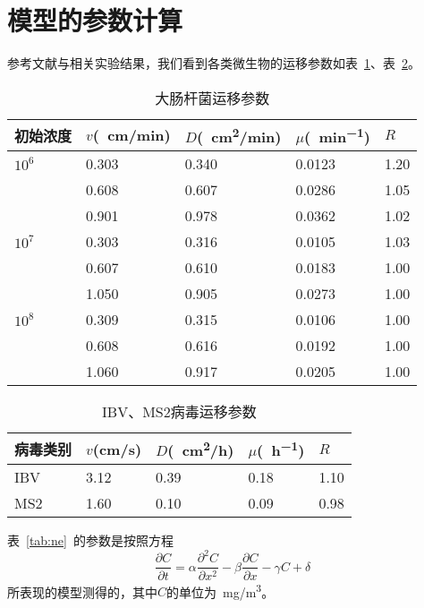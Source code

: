 \section{模型的参数计算}
参考文献与相关实验结果，我们看到各类微生物的运移参数如表~\ref{tab:dachangganjun}、表~\ref{tab:ibv}。
\begin{table}[!ht]
\caption{\label{tab:dachangganjun}大肠杆菌运移参数}
\centering
\begin{tabularx}{14cm}{XXXXX}
\toprule
初始浓度 & $v$(\SI{}{cm/min}) & $D$(\SI{}{cm^2/min}) & $\mu$(\SI{}{min^{-1}}) & $R$\\
\midrule
$10^6$	&	0.303	&	0.340	&	0.0123	&	1.20 \\
		&	0.608	&	0.607	&	0.0286	&	1.05 \\
		&	0.901	&	0.978	&	0.0362	&	1.02 \\
$10^7$	&	0.303	&	0.316	&	0.0105	&	1.03 \\
		&	0.607	&	0.610	&	0.0183	&	1.00 \\
		&	1.050	&	0.905	&	0.0273	&	1.00 \\
$10^8$	&	0.309	&	0.315	&	0.0106	&	1.00 \\
		&	0.608	&	0.616	&	0.0192	&	1.00 \\
		&	1.060	&	0.917	&	0.0205	&	1.00 \\
\bottomrule
\end{tabularx}
\end{table}
\par
\begin{table}[!ht]
\caption{\label{tab:ibv}IBV、MS2病毒运移参数}
\centering
\begin{tabularx}{14cm}{XXXXX}
\toprule
病毒类别 & $v$(cm/s) & $D$(\SI{}{cm^2/h}) & $\mu$(\SI{}{h^{-1}}) & $R$\\
\midrule
IBV		& 3.12	& 0.39	&	0.18	&	1.10	\\
MS2		& 1.60	& 0.10	&	0.09	&	0.98	\\
\bottomrule
\end{tabularx}
\end{table}
\par
表~\ref{tab:ne}~的参数是按照方程
\begin{equation}
	\dfrac{\partial C}{\partial t}= \alpha\dfrac{\partial^2 C}{\partial x^2}-\beta\dfrac{\partial C}{\partial x}-\gamma C + \delta
\end{equation}
所表现的模型测得的，其中$C$的单位为\SI{}{mg/m^3}。\par
